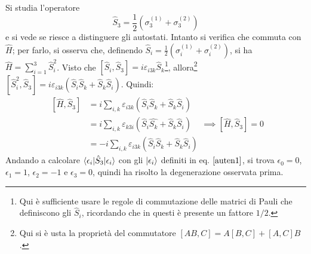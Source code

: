 \documentclass[11pt, a4paper]{scrartcl} %
\numberwithin{equation}{subsection}
\theoremstyle{style2}
\theoremstyle{style1}
\begin{document}
Si studia l'operatore 
\begin{equation}
	\hat{S}_3 = \frac{1}{2} \left(\sigma _3^{(1)} + \sigma _3 ^{(2)} \right) 
\end{equation}
e si vede se riesce a distinguere gli autostati.
Intanto si verifica che commuta con $\hat{H}$; per farlo, si osserva che, definendo $\hat{S}_i = \frac{1}{2}\left(\sigma _i^{(1)} + \sigma _i^{(2)} \right) $, si ha $\hat{H}= \sum_{i=1}^{3} \hat{S}_i^2$. 
Visto che $[\hat{S}_i , \hat{S}_3] = i \varepsilon _{i3k} \hat{S}_k$\footnote{Qui \`e sufficiente usare le regole di commutazione delle matrici di Pauli che definiscono gli $\hat{S}_i$, ricordando che in questi \`e presente un fattore $1 / 2$.}, allora\footnote{Qui si \`e usta la propriet\`a del commutatore $[AB,C] = A[B,C] + [A,C]B$.} $[\hat{S}_i^2 , \hat{S}_3] = i \varepsilon _{i 3 k} (\hat{S}_i \hat{S}_k + \hat{S}_k \hat{S}_i)$.
Quindi:
\[
	\begin{split}
		[\hat{H},\hat{S}_3] &= i  \sum_{i,k}^{} \varepsilon _{i 3 k } (\hat{S}_i  \hat{S}_k + \hat{S}_k \hat{S}_i) \\
				    &= i \sum_{i,k}^{} \varepsilon _{k 3 i} (\hat{S}_{i} \hat{S_k} + \hat{S}_k \hat{S}_i) \\
				    &= -i  \sum_{i,k}^{} \varepsilon _{i 3 k } (\hat{S}_i  \hat{S}_k + \hat{S}_k \hat{S}_i)
	\end{split} \implies [\hat{H},\hat{S}_3] = 0
\] 
Andando a calcolare $\braket{\epsilon _i|\hat{S}_3|\epsilon _i} $ con gli $\ket{\epsilon _i} $ definiti in eq. $\ref{auten1}$, si trova $\epsilon _0= 0$, $ \epsilon _1 = 1$, $ \epsilon _2 = -1$ e $\epsilon _3 = 0 $, quindi ha risolto la degenerazione osservata prima.
\end{document}

